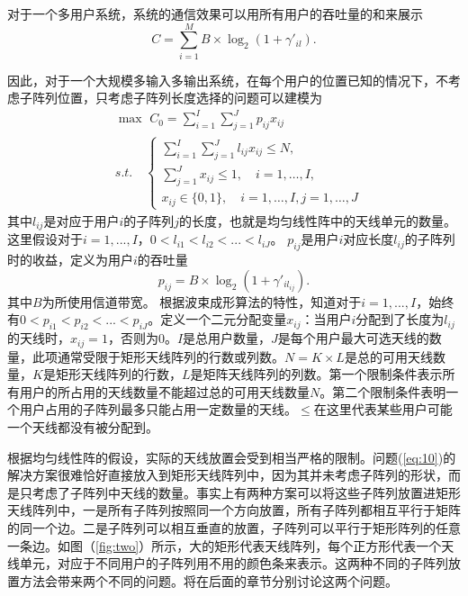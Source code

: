 对于一个多用户系统，系统的通信效果可以用所有用户的吞吐量的和来展示
\begin{equation}
C = \sum\limits_{i = 1}^M B\times{{{\log }_2}(1 + \gamma'_{il})}.
\end{equation}

因此，对于一个大规模多输入多输出系统，在每个用户的位置已知的情况下，不考虑子阵列位置，只考虑子阵列长度选择的问题可以建模为
\begin{equation}\label{eq:10}
\begin{split}
&\max \,\, C_0 = \sum\limits_{i=1}^{I}\sum\limits_{j=1}^J p_{ij} x_{ij}\\
&s.t.\quad  \left\{\begin{array}{l}
\sum\limits_{i=1}^{I}\sum\limits_{j=1}^J l_{ij}x_{ij}\leq N,\\
\sum\limits_{j=1}^{J} x_{ij}\leq 1,\quad i = 1,\dots,I,\\
x_{ij}\in\{0,1\}, \quad  i=1,\dots,I, j=1,\dots,J \end{array}\right.
\end{split}
\end{equation}
其中$l_{ij}$是对应于用户$i$的子阵列$j$的长度，也就是均匀线性阵中的天线单元的数量。这里假设对于$i = 1,...,I$，$0<l_{i1}<l_{i2}<...<l_{iJ}$。
$p_{ij}$是用户$i$对应长度$l_{ij}$的子阵列时的收益，定义为用户$i$的吞吐量
\begin{equation}\label{eq:3}
p_{ij} = B\times {{\log }_2}(1 + \gamma'_{il_{ij}}).
\end{equation}
其中$B$为所使用信道带宽。
根据波束成形算法的特性，知道对于$i = 1,...,I$，始终有$0<p_{i1}<p_{i2}<...<p_{iJ}$。定义一个二元分配变量$x_{ij}$：当用户$i$分配到了长度为$l_{ij}$的天线时，$x_{ij}=1$，否则为$0$。$I$是总用户数量，$J$是每个用户最大可选天线的数量，此项通常受限于矩形天线阵列的行数或列数。$N = K\times L$是总的可用天线数量，$K$是矩形天线阵列的行数，$L$是矩阵天线阵列的列数。第一个限制条件表示所有用户的所占用的天线数量不能超过总的可用天线数量$N$。第二个限制条件表明一个用户占用的子阵列最多只能占用一定数量的天线。$\le$在这里代表某些用户可能一个天线都没有被分配到。

根据均匀线性阵的假设，实际的天线放置会受到相当严格的限制。问题(\ref{eq:10})的解决方案很难恰好直接放入到矩形天线阵列中，因为其并未考虑子阵列的形状，而是只考虑了子阵列中天线的数量。事实上有两种方案可以将这些子阵列放置进矩形天线阵列中，一是所有子阵列按照同一个方向放置，所有子阵列都相互平行于矩阵的同一个边。二是子阵列可以相互垂直的放置，子阵列可以平行于矩形阵列的任意一条边。如图（\ref{fig:two}）所示，大的矩形代表天线阵列，每个正方形代表一个天线单元，对应于不同用户的子阵列用不用的颜色条来表示。这两种不同的子阵列放置方法会带来两个不同的问题。将在后面的章节分别讨论这两个问题。

